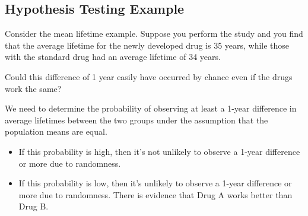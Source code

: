 \documentclass[
  letterpaper,
  DIV=11,
  numbers=noendperiod]{scrartcl}
\providecommand{\tightlist}{%
  \setlength{\itemsep}{0pt}\setlength{\parskip}{0pt}}
\begin{document}
\subsection{Hypothesis Testing
Example}\label{hypothesis-testing-example}

Consider the mean lifetime example. Suppose you perform the study and
you find that the average lifetime for the newly developed drug is 35
years, while those with the standard drug had an average lifetime of 34
years.

\begin{tcolorbox}[enhanced jigsaw, bottomtitle=1mm, colback=white, opacityback=0, leftrule=.75mm, opacitybacktitle=0.6, coltitle=black, left=2mm, colframe=quarto-callout-note-color-frame, toptitle=1mm, colbacktitle=quarto-callout-note-color!10!white, titlerule=0mm, title=\textcolor{quarto-callout-note-color}{\faInfo}\hspace{0.5em}{Note}, arc=.35mm, rightrule=.15mm, breakable, bottomrule=.15mm, toprule=.15mm]

Could this difference of 1 year easily have occurred by chance even if
the drugs work the same?

\end{tcolorbox}

\begin{tcolorbox}[enhanced jigsaw, bottomtitle=1mm, colback=white, opacityback=0, leftrule=.75mm, opacitybacktitle=0.6, coltitle=black, left=2mm, colframe=quarto-callout-important-color-frame, toptitle=1mm, colbacktitle=quarto-callout-important-color!10!white, titlerule=0mm, title=\textcolor{quarto-callout-important-color}{\faExclamation}\hspace{0.5em}{Important}, arc=.35mm, rightrule=.15mm, breakable, bottomrule=.15mm, toprule=.15mm]

We need to determine the probability of observing at least a 1-year
difference in average lifetimes between the two groups under the
assumption that the population means are equal.

\begin{itemize}
\tightlist
\item
  If this probability is high, then it's not unlikely to observe a
  1-year difference or more due to randomness.
\item
  If this probability is low, then it's unlikely to observe a 1-year
  difference or more due to randomness. There is evidence that Drug A
  works better than Drug B.
\end{itemize}

\end{tcolorbox}
\end{document}
